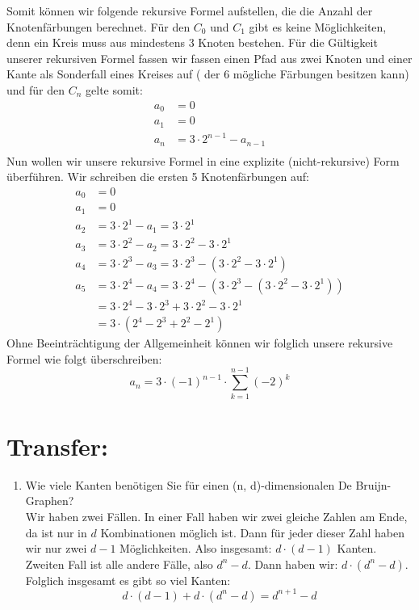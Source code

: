      Somit können wir folgende rekursive Formel aufstellen, die die Anzahl der Knotenfärbungen 
     berechnet. Für den $C_0$  und $C_1$ gibt es keine Möglichkeiten, denn ein Kreis muss aus mindestens 3 Knoten bestehen. Für die Gültigkeit unserer rekursiven Formel fassen wir fassen einen Pfad aus zwei Knoten und einer Kante als Sonderfall eines Kreises auf ( der 6 mögliche Färbungen besitzen kann) und für den $C_n$ gelte somit: 
     \begin{align*} 
     a_0 &= 0 \\ 
     a_1 &= 0  \\
     a_n &= 3\cdot 2^{n-1} - a_{n-1}\\ 
     \end{align*}
     Nun wollen wir unsere rekursive Formel in eine explizite (nicht-rekursive) Form überführen. Wir schreiben die ersten 5 Knotenfärbungen auf:
     \begin{align*}
          a_0 &= 0\\
          a_1 &= 0\\
          a_2 &= 3\cdot 2^1 - a_1 = 3\cdot 2^1\\
          a_3 &= 3\cdot 2^2 - a_2 = 3\cdot 2^2 - 3\cdot 2^1\\
          a_4 &= 3\cdot 2^3 - a_3 = 3\cdot 2^3 - (3\cdot 2^2 - 3\cdot 2^1)\\
          a_5 &= 3\cdot 2^4 - a_4 = 3\cdot 2^4 - (3\cdot 2^3 - (3\cdot 2^2 - 3\cdot 2^1))\\
          &= 3\cdot 2^4 - 3\cdot 2^3 + 3\cdot 2^2 - 3\cdot 2^1\\
          &= 3\cdot (2^4 - 2^3 + 2^2 - 2^1)
        \end{align*} 
     Ohne Beeinträchtigung der Allgemeinheit können wir folglich unsere rekursive Formel wie folgt überschreiben:
     $$ a_n = 3 \cdot (-1)^{n-1} \cdot \sum_{k=1}^{n-1}(-2)^k$$
    \section*{Transfer:}
    \begin{enumerate}[label=(\alph*)]
    	\item Wie viele Kanten benötigen Sie für einen (n, d)-dimensionalen De Bruijn-Graphen?\\
        Wir haben zwei Fällen. In einer Fall haben wir zwei gleiche Zahlen am Ende, da ist nur in $d$ 
        Kombinationen möglich ist. Dann für jeder dieser Zahl haben wir nur zwei $d-1$ Möglichkeiten. 
        Also insgesamt: $d\cdot(d-1)$ Kanten. Zweiten Fall ist alle andere Fälle, also $d^n-d$. Dann haben
        wir: $d\cdot(d^n-d)$. Folglich insgesamt es gibt so viel Kanten:
        $$d\cdot(d-1) + d\cdot(d^n-d) = d^{n+1}-d$$
    \end{enumerate}
